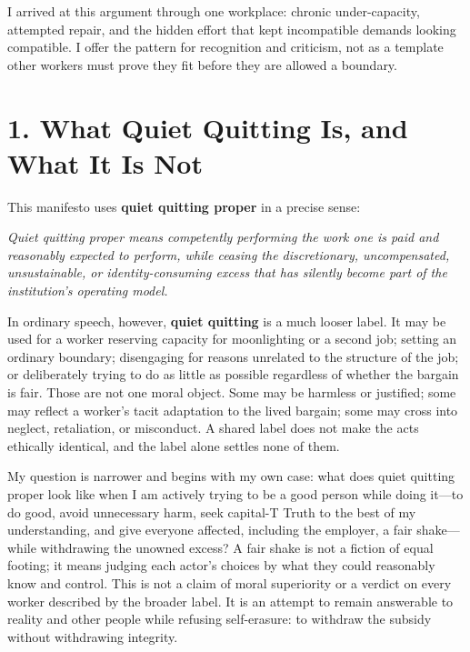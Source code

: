 \documentclass[11pt,oneside]{article}
\renewenvironment{quote}
  {\begin{tcolorbox}[
      enhanced,
      breakable,
      colback=ManifestLight,
      colframe=ManifestRule,
      boxrule=0pt,
      leftrule=3pt,
      arc=0pt,
      outer arc=0pt,
      left=10pt,right=10pt,top=8pt,bottom=8pt,
      before skip=0.8em,after skip=0.8em
    ]\itshape}
  {\end{tcolorbox}}
\begin{document}
I arrived at this argument through one workplace: chronic
under-capacity, attempted repair, and the hidden effort that kept
incompatible demands looking compatible. I offer the pattern for
recognition and criticism, not as a template other workers must prove
they fit before they are allowed a boundary.

\hypertarget{what-quiet-quitting-is-and-what-it-is-not}{%
\section{1. What Quiet Quitting Is, and What It Is
Not}\label{what-quiet-quitting-is-and-what-it-is-not}}

This manifesto uses \textbf{quiet quitting proper} in a precise sense:

\begin{quote}
Quiet quitting proper means competently performing the work one is paid
and reasonably expected to perform, while ceasing the discretionary,
uncompensated, unsustainable, or identity-consuming excess that has
silently become part of the institution's operating model.
\end{quote}

In ordinary speech, however, \textbf{quiet quitting} is a much looser
label. It may be used for a worker reserving capacity for moonlighting
or a second job; setting an ordinary boundary; disengaging for reasons
unrelated to the structure of the job; or deliberately trying to do as
little as possible regardless of whether the bargain is fair. Those are
not one moral object. Some may be harmless or justified; some may
reflect a worker's tacit adaptation to the lived bargain; some may cross
into neglect, retaliation, or misconduct. A shared label does not make
the acts ethically identical, and the label alone settles none of them.

My question is narrower and begins with my own case: what does quiet
quitting proper look like when I am actively trying to be a good person
while doing it---to do good, avoid unnecessary harm, seek capital-T
Truth to the best of my understanding, and give everyone affected,
including the employer, a fair shake---while withdrawing the unowned
excess? A fair shake is not a fiction of equal footing; it means judging
each actor's choices by what they could reasonably know and control.
This is not a claim of moral superiority or a verdict on every worker
described by the broader label. It is an attempt to remain answerable to
reality and other people while refusing self-erasure: to withdraw the
subsidy without withdrawing integrity.
\end{document}
